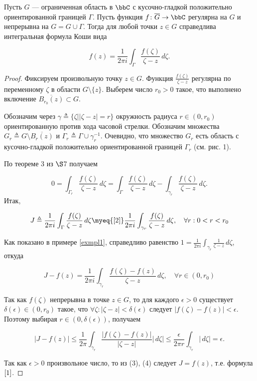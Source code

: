 \begin{thm} \label{T1}

 Пусть $G$ --- ограниченная область в $\bbC$ с кусочно-гладкой положительно ориентированной границей $\Gamma$. Пусть функция $f\colon \overline{G}\to \bbC$ регулярна на $G$ и непрерывна на $G=G\cup\Gamma$. Тогда для любой точки $z\in G$ справедлива интегральная формула Коши вида
 
 \begin{equation} \label{1}
 f(z) = \frac{1}{2\pi i}\int_\Gamma \frac{f(\zeta)}{\zeta - z}\,d\zeta.
 \end{equation}
\end{thm}
\begin{proof}
Фиксируем произвольную точку $z \in G$. Функция $\frac{f(\zeta)}{\zeta - z}$ регулярна по переменному $\zeta$ в области $G \setminus \{z\}$. Выберем число $r_0 > 0$ такое, что выполнено включение $\overline{B_{r_0}(z)}\subset G$. 

Обозначим через $\gamma \triangleq \{ \zeta \bigl| |\zeta - z| = r \}$ окружность радиуса $r \in (0, r_0)$ ориентированную против хода часовой стрелки. Обозначим множества $G_r \triangleq G \setminus \overline{B_r(z)}$ и $\Gamma_r \triangleq \Gamma \cup \gamma_r^{-1}$. Очевидно, что множество $G_r$ есть область с кусочно-гладкой положительно ориентированной границей $\Gamma_r$ (см. рис. 1). 

По теореме 3 из $\S$7 получаем

 \begin{equation} \label{2}
 0 = \int_{\Gamma_r} \frac{f(\zeta)}{\zeta - z}\,d\zeta = \int_\Gamma \frac{f(\zeta)}{\zeta - z}\,d\zeta - \int_{\gamma_r} \frac{f(\zeta)}{\zeta - z}\,d\zeta.
 \end{equation}
Итак,

\begin{equation} \label{3}
J \triangleq \frac{1}{2\pi i} \int_\Gamma \frac{f(\zeta)}{\zeta - z}\,d\zeta \myeq{\eqref{2}} \frac{1}{2\pi i} \int_{\gamma_r} \frac{f(\zeta)}{\zeta - z}\,d\zeta,  \quad  \forall r: 0 < r < r_0
\end{equation}

Как показано в примере \ref{exmpl1}, справедливо равенство $1 = \frac{1}{2\pi i} \int_{\gamma_r} \frac{1}{\zeta - z}\,d\zeta$, откуда 

$$J - f(z) = \frac{1}{2\pi i} \int_{\gamma_r} \frac{f(\zeta) - f(z)}{\zeta - z}\,d\zeta, \quad  \forall r \in (0,r_0)$$

Так как $f(\zeta)$ непрерывна в точке $z \in G$, то для каждого $\epsilon > 0$ существует $\delta(\epsilon) \in (0, r_0)$ такое, что $\forall \zeta : |\zeta - z| < \delta(\epsilon)$ следует $|f(\zeta) - f(z)| < \epsilon$. Поэтому выбирая $r \in (0, \delta(\epsilon))$, получаем

\begin{equation} \label{4}
|J - f(z)| \le \frac{1}{2\pi} \int_{\gamma_r} \frac{|f(\zeta) - f(z)|}{|\zeta - z|}|\,d\zeta| \le 
\frac{\epsilon}{2 \pi r} \int_{\gamma_r} |\,d\zeta| = \epsilon.
\end{equation}

Так как $\epsilon > 0$ произвольное число, то из (3), (4) следует $J = f(z)$, т.е. формула $\eqref{1}$.
\end{proof}


